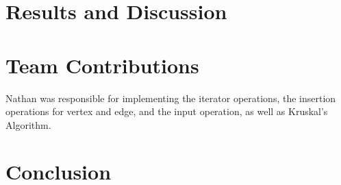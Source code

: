 \documentclass[titlepage]{article}
\begin{document}
\begin{multicols*}{2}
		\section{Results and Discussion}
		\section{Team Contributions}
                Nathan was responsible for implementing the iterator operations, the insertion operations for vertex and edge, and the input operation, as well as Kruskal's Algorithm.
		\section{Conclusion}
	\end{multicols*}
\end{document}
